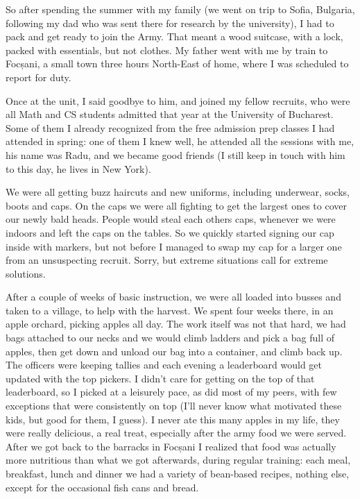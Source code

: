 \documentclass[12pt]{book}
\begin{document}
So after spending the summer with my family (we went on trip to Sofia,
Bulgaria, following my dad who was sent there for research by the
university), I had to pack and get ready to join the Army. That meant a
wood suitcase, with a lock, packed with essentials, but not clothes. My
father went with me by train to Focșani, a small town three hours
North-East of home, where I was scheduled to report for duty.

Once at the unit, I said goodbye to him, and joined my fellow recruits,
who were all Math and CS students admitted that year at the University
of Bucharest. Some of them I already recognized from the free admission
prep classes I had attended in spring: one of them I knew well, he
attended all the sessions with me, his name was Radu, and we became good
friends (I still keep in touch with him to this day, he lives in New
York).

We were all getting buzz haircuts and new uniforms, including underwear,
socks, boots and caps. On the caps we were all fighting to get the
largest ones to cover our newly bald heads. People would steal each
others caps, whenever we were indoors and left the caps on the tables.
So we quickly started signing our cap inside with markers, but not
before I managed to swap my cap for a larger one from an unsuspecting
recruit. Sorry, but extreme situations call for extreme solutions.

After a couple of weeks of basic instruction, we were all loaded into
busses and taken to a village, to help with the harvest. We spent four
weeks there, in an apple orchard, picking apples all day. The work
itself was not that hard, we had bags attached to our necks and we would
climb ladders and pick a bag full of apples, then get down and unload
our bag into a container, and climb back up. The officers were keeping
tallies and each evening a leaderboard would get updated with the top
pickers. I didn't care for getting on the top of that leaderboard, so I
picked at a leisurely pace, as did most of my peers, with few exceptions
that were consistently on top (I'll never know what motivated these
kids, but good for them, I guess). I never ate this many apples in my
life, they were really delicious, a real treat, especially after the
army food we were served. After we got back to the barracks in Focșani I
realized that food was actually more nutritious than what we got
afterwards, during regular training: each meal, breakfast, lunch and
dinner we had a variety of bean-based recipes, nothing else, except for
the occasional fish cans and bread.
\end{document}
